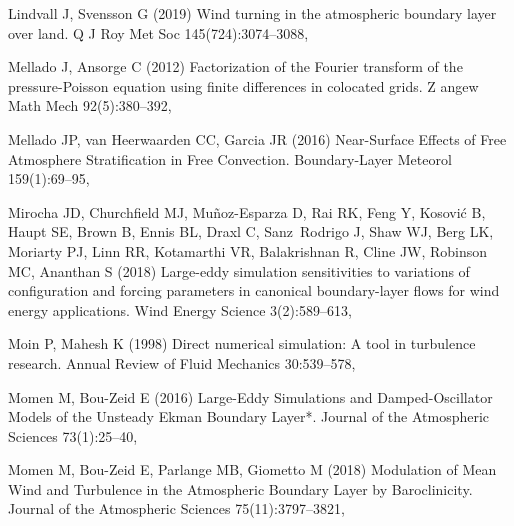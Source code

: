 \documentclass[smallcondensed,final]{svjour3}
\begin{document}
\begin{thebibliography}{57}
Lindvall J, Svensson G (2019) Wind turning in the atmospheric boundary layer
  over land. Q J Roy Met Soc 145(724):3074--3088, 

Mellado J, Ansorge C (2012) Factorization of the {{Fourier}} transform of the
  pressure-{{Poisson}} equation using finite differences in colocated grids. Z
  angew Math Mech 92(5):380--392, 

Mellado JP, {van Heerwaarden} CC, Garcia JR (2016) Near-{{Surface Effects}} of
  {{Free Atmosphere Stratification}} in {{Free Convection}}. Boundary-Layer
  Meteorol 159(1):69--95, 

Mirocha JD, Churchfield MJ, {Mu{\~n}oz-Esparza} D, Rai RK, Feng Y, Kosovi{\'c}
  B, Haupt SE, Brown B, Ennis BL, Draxl C, Sanz~Rodrigo J, Shaw WJ, Berg LK,
  Moriarty PJ, Linn RR, Kotamarthi VR, Balakrishnan R, Cline JW, Robinson MC,
  Ananthan S (2018) Large-eddy simulation sensitivities to variations of
  configuration and forcing parameters in canonical boundary-layer flows for
  wind energy applications. Wind Energy Science 3(2):589--613, 

Moin P, Mahesh K (1998) Direct numerical simulation: {{A}} tool in turbulence
  research. Annual Review of Fluid Mechanics 30:539--578,

Momen M, {Bou-Zeid} E (2016) Large-{{Eddy Simulations}} and {{Damped-Oscillator
  Models}} of the {{Unsteady Ekman Boundary Layer}}*. Journal of the
  Atmospheric Sciences 73(1):25--40, 

Momen M, {Bou-Zeid} E, Parlange MB, Giometto M (2018) Modulation of {{Mean
  Wind}} and {{Turbulence}} in the {{Atmospheric Boundary Layer}} by
  {{Baroclinicity}}. Journal of the Atmospheric Sciences 75(11):3797--3821,


\end{thebibliography}
\end{document}
